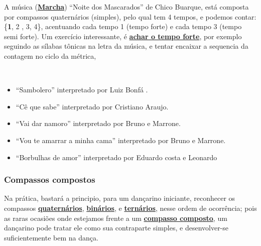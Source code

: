 \begin{example}
\label{ex:compassosimples4t}
A música (\hyperref[subsec:marcha]{\textbf{Marcha}}) ``Noite dos Mascarados'' de Chico Buarque,
está composta por compassos quaternários (simples), pelo qual tem 4 tempos,
e podemos contar: \{\textbf{1}, 2 , 3, 4\}, acentuando cada tempo 1 (tempo forte) e cada tempo 3 (tempo semi forte).
Um exercício interessante, é \hyperref[subsec:perceberTF1]{\textbf{achar o tempo forte}},
por exemplo seguindo as sílabas tônicas na letra da música,
e tentar encaixar a sequencia da contagem no ciclo da métrica, 
\end{example}

\begin{example}
~
\begin{itemize}
\item ``Sambolero'' interpretado por Luiz Bonfá \cite[pp. 49]{sambolero}.
\item ``Cê que sabe'' interpretado por Cristiano Araujo.
\item ``Vai dar namoro'' interpretado por Bruno e Marrone.
\item ``Vou te amarrar a minha cama'' interpretado por Bruno e Marrone.
\item ``Borbulhas de amor'' interpretado por Eduardo costa e Leonardo%
\end{itemize}
\end{example}

\subsubsection{Compassos compostos}
Na prática, bastará a principio, para um dançarino iniciante,
reconhecer os compassos \hyperref[subsec:compassoquaternario]{\textbf{quaternários}}, 
\hyperref[subsec:compassobinario]{\textbf{binários}}, e 
\hyperref[subsec:compassoternario]{\textbf{ternários}},
nesse ordem de ocorrência;
pois as raras ocasiões onde estejamos frente a um \hyperref[sec:compaso]{\textbf{compasso composto}},
um dançarino pode tratar ele como sua contraparte simples,
e desenvolver-se suficientemente bem na dança. 

